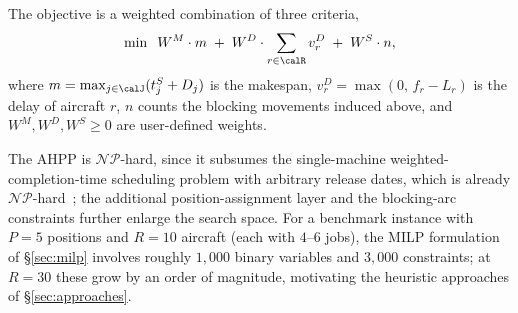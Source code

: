 The objective is a weighted combination of three criteria,
\begin{equation}
  \label{eq:obj}
  \min \;\; W^M \cdot m
        \;+\; W^D \cdot \sum_{r \in \calR} v^D_r
        \;+\; W^S \cdot n,
\end{equation}
where $m = \max_{j \in \calJ}(t^S_j + D_j)$ is the makespan,
$v^D_r = \max(0,\, f_r - L_r)$ is the delay of aircraft $r$, $n$ counts
the blocking movements induced above, and $W^M, W^D, W^S \ge 0$ are
user-defined weights.

The AHPP is $\mathcal{NP}$-hard, since it subsumes the single-machine
weighted-completion-time scheduling problem with arbitrary release dates,
which is already $\mathcal{NP}$-hard~\citep{Lenstra1977}; the additional
position-assignment layer and the blocking-arc constraints further enlarge
the search space.  For a benchmark instance with $P = 5$ positions and
$R = 10$ aircraft (each with $4$--$6$ jobs), the MILP formulation of
\S\ref{sec:milp} involves roughly $1{,}000$ binary variables and $3{,}000$
constraints; at $R = 30$ these grow by an order of magnitude, motivating
the heuristic approaches of \S\ref{sec:approaches}.
